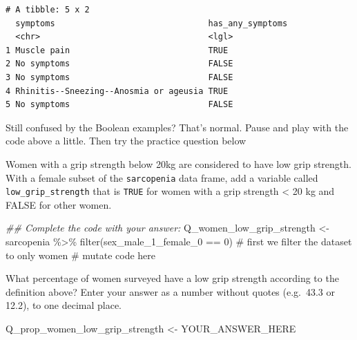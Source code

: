 \documentclass[
  letterpaper,
  DIV=11,
  numbers=noendperiod]{scrreprt}
\newenvironment{Shaded}{\begin{snugshade}}{\end{snugshade}}
\newcommand{\CommentTok}[1]{\textcolor[rgb]{0.37,0.37,0.37}{#1}}
\newcommand{\DecValTok}[1]{\textcolor[rgb]{0.68,0.00,0.00}{#1}}
\newcommand{\DocumentationTok}[1]{\textcolor[rgb]{0.37,0.37,0.37}{\textit{#1}}}
\newcommand{\FunctionTok}[1]{\textcolor[rgb]{0.28,0.35,0.67}{#1}}
\newcommand{\NormalTok}[1]{\textcolor[rgb]{0.00,0.23,0.31}{#1}}
\newcommand{\OtherTok}[1]{\textcolor[rgb]{0.00,0.23,0.31}{#1}}
\newcommand{\SpecialCharTok}[1]{\textcolor[rgb]{0.37,0.37,0.37}{#1}}
\begin{document}
\begin{verbatim}
# A tibble: 5 x 2
  symptoms                               has_any_symptoms
  <chr>                                  <lgl>           
1 Muscle pain                            TRUE            
2 No symptoms                            FALSE           
3 No symptoms                            FALSE           
4 Rhinitis--Sneezing--Anosmia or ageusia TRUE            
5 No symptoms                            FALSE           
\end{verbatim}

Still confused by the Boolean examples? That's normal. Pause and play
with the code above a little. Then try the practice question below

\begin{tcolorbox}[enhanced jigsaw, titlerule=0mm, colback=white, left=2mm, breakable, opacitybacktitle=0.6, colbacktitle=quarto-callout-tip-color!10!white, colframe=quarto-callout-tip-color-frame, bottomtitle=1mm, opacityback=0, coltitle=black, arc=.35mm, toptitle=1mm, title=\textcolor{quarto-callout-tip-color}{\faLightbulb}\hspace{0.5em}{Practice}, leftrule=.75mm, toprule=.15mm, bottomrule=.15mm, rightrule=.15mm]

Women with a grip strength below 20kg are considered to have low grip
strength. With a female subset of the \texttt{sarcopenia} data frame,
add a variable called \texttt{low\_grip\_strength} that is \texttt{TRUE}
for women with a grip strength \textless{} 20 kg and FALSE for other
women.

\begin{Shaded}
\begin{Highlighting}[]
\DocumentationTok{\#\# Complete the code with your answer:}
\NormalTok{Q\_women\_low\_grip\_strength }\OtherTok{\textless{}{-}} 
\NormalTok{  sarcopenia }\SpecialCharTok{\%\textgreater{}\%} 
  \FunctionTok{filter}\NormalTok{(sex\_male\_1\_female\_0 }\SpecialCharTok{==} \DecValTok{0}\NormalTok{) }\CommentTok{\# first we filter the dataset to only women}
  \CommentTok{\# mutate code here}
\end{Highlighting}
\end{Shaded}

What percentage of women surveyed have a low grip strength according to
the definition above? Enter your answer as a number without quotes
(e.g.~43.3 or 12.2), to one decimal place.

\begin{Shaded}
\begin{Highlighting}[]
\NormalTok{Q\_prop\_women\_low\_grip\_strength }\OtherTok{\textless{}{-}}\NormalTok{ YOUR\_ANSWER\_HERE}
\end{Highlighting}
\end{Shaded}

\end{tcolorbox}
\end{document}
